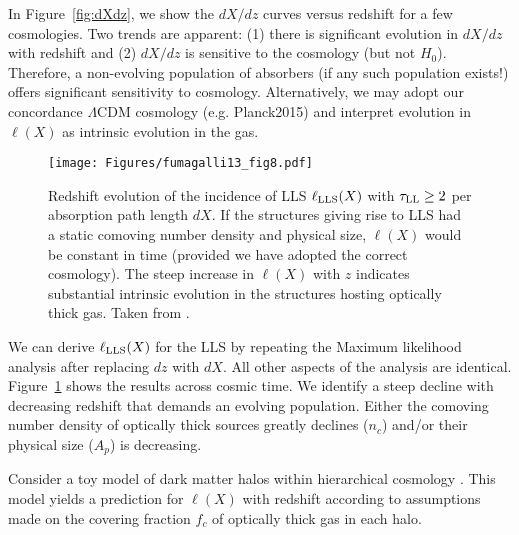 \documentclass[graybox]{svmult}
\begin{document}
In Figure~\ref{fig:dXdz}, we show the $dX/dz$ curves versus redshift
for a few cosmologies.  Two trends are apparent:  
(1) there is significant evolution in $dX/dz$ with redshift and
(2) $dX/dz$ is sensitive to the cosmology (but not $H_0$).
Therefore, a non-evolving population of absorbers (if any such
population exists!) offers significant sensitivity to cosmology.
Alternatively, we may adopt our concordance $\Lambda$CDM 
cosmology (e.g. Planck2015) and interpret evolution in
$\ell(X)$ as intrinsic evolution in the gas.


%
\begin{figure}[ht]
\sidecaption
\texttt{[image: Figures/fumagalli13\_fig8.pdf]}
%
%
\caption{Redshift evolution of the incidence of LLS
$\ell_{\rm LLS}(X)$ with $\tau_{\rm LL} \ge 2$ per absorption
path length $dX$.  If the structures giving rise to LLS had a static
comoving number density and physical size, $\ell(X)$
would be constant in time (provided we have adopted the
correct cosmology).  The steep increase in $\ell(X)$ with $z$
indicates substantial intrinsic evolution in the structures
hosting optically thick gas.
Taken from \cite{fop+13}.
}
\label{fig:lX_LLS}       %
\end{figure}

We can derive $\ell_{\rm LLS}(X)$ for the LLS by 
repeating the Maximum likelihood analysis after
replacing $dz$ with $dX$.  All other aspects of the 
analysis are identical.
Figure~\ref{fig:lX_LLS} shows the results across
cosmic time.
We identify a steep decline with decreasing
redshift that demands an evolving population.
Either the comoving number density of optically thick sources
greatly declines ($n_c$) and/or their physical size ($A_p$)
is decreasing.

Consider a toy model of dark matter halos within hierarchical
cosmology \cite[]{fop+13}.  This model yields a prediction for
$\ell(X)$ with redshift according to assumptions made on the
covering fraction $f_c$ of optically thick gas in each halo.
\end{document}
